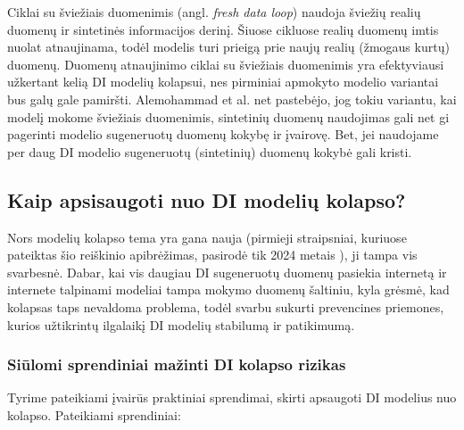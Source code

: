 \documentclass{VUMIFInfKursinis}
\begin{document}
 \label{CiklaiSuSvieziaisDuomenimis}
Ciklai su šviežiais duomenimis (angl. \textsl{fresh data loop}) naudoja šviežių realių duomenų ir sintetinės informacijos derinį. Šiuose cikluose realių duomenų imtis nuolat atnaujinama, todėl modelis turi prieigą prie naujų realių (žmogaus kurtų) duomenų. Duomenų atnaujinimo ciklai su šviežiais duomenimis yra efektyviausi užkertant kelią DI modelių kolapsui, nes  pirminiai apmokyto modelio variantai bus galų gale pamiršti. Alemohammad et al. \cite{ModelsGoMAD} net pastebėjo, jog tokiu variantu, kai modelį mokome šviežiais duomenimis, sintetinių duomenų naudojimas gali net gi pagerinti modelio sugeneruotų duomenų kokybę ir įvairovę. Bet, jei naudojame per daug DI modelio sugeneruotų (sintetinių) duomenų kokybė gali kristi. 



\subsection{Kaip apsisaugoti nuo DI modelių kolapso?}

Nors modelių kolapso tema yra gana nauja (pirmieji straipsniai, kuriuose pateiktas šio reiškinio apibrėžimas, pasirodė tik 2024 metais \cite{AICollapseNature}), ji tampa vis svarbesnė. Dabar, kai vis daugiau DI sugeneruotų duomenų pasiekia internetą ir internete talpinami modeliai tampa mokymo duomenų šaltiniu, kyla grėsmė, kad kolapsas taps nevaldoma problema, todėl svarbu sukurti prevencines priemones, kurios užtikrintų ilgalaikį DI modelių stabilumą ir patikimumą.

\subsubsection{Siūlomi sprendiniai mažinti DI kolapso rizikas}

Tyrime \cite{DesniuPasiulymai} pateikiami įvairūs praktiniai sprendimai, skirti apsaugoti DI modelius nuo kolapso. Pateikiami sprendiniai:
\end{document}
